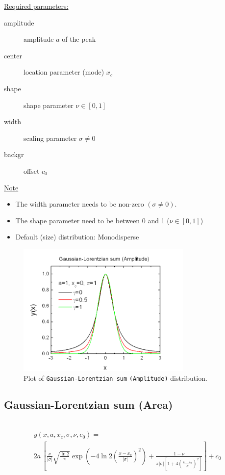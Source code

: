 \vspace{5mm}

\uline{Required parameters:}
\begin{description}
    \item[amplitude] amplitude $a$ of the peak
    \item[center] location parameter (mode) $x_c$
    \item[shape] shape parameter $\nu\in [0,1]$
    \item[width] scaling parameter $\sigma \neq 0$
    \item[backgr] offset $c_0$
\end{description}

\uline{Note}
\begin{itemize}
  \item The width parameter needs to be non-zero $(\sigma\neq 0)$.
  \item The shape parameter need to be between 0 and 1 ($\nu\in [0,1]$)
  \item Default (size) distribution: Monodisperse
\end{itemize}
\begin{figure}[htb]
\begin{center}
\includegraphics[width=0.768\textwidth]{GaussianLorentzianSumAmplitude.png}
\end{center}
\caption{Plot of \texttt{Gaussian-Lorentzian sum} \texttt{(Amplitude)} distribution.}
\label{fig:GaussianLorentzianSumAmplitude}
\end{figure}

\clearpage

\subsection{Gaussian-Lorentzian sum (Area)} ~\\
\label{sec:GaussianLorentzianSumArea}
\begin{multline}
y(x,a,x_c,\sigma,\nu,c_0) = \\
2a\,\left[\frac{\nu}{|\sigma|}\sqrt{\frac{\ln 2}{\pi}}\exp\left({
-4\ln
2\left(\frac{x-x_c}{|\sigma|}\right)^2}\right)+\frac{1-\nu}{\pi|\sigma|\left[1+4\left(\frac{x-x_c}{|\sigma|}\right)^2\right]}\right]+c_0
\end{multline}
\vspace{5mm}

